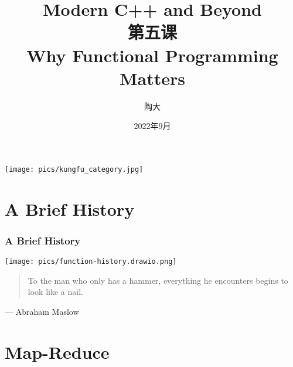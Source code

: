 \documentclass[UTF8,lualatex]{ctexbeamer}
\title{\kaishu Modern C++ and Beyond\\
    \small
    第五课\\
    Why Functional Programming Matters}
\author{陶大}
\date{2022年9月}
\begin{document}
\songti

\begin{frame}[plain]
    \titlepage
\end{frame}

\begin{frame}[plain]
    \begin{center}
        \texttt{[image: pics/kungfu\_category.jpg]}
    \end{center}
\end{frame}

\begin{frame}[plain]
    \tableofcontents
\end{frame}

\section{A Brief History}

\begin{frame}
    \frametitle{A Brief History}
    \begin{center}
        \texttt{[image: pics/function-history.drawio.png]}
    \end{center}
\end{frame}


\begin{frame}
    \Large
    \begin{quotation}
        To the man who only has a hammer, everything he encounters begins to look like a nail.
    \end{quotation}
    \flushright\normalsize --- {Abraham Maslow}
\end{frame}


\section{Map-Reduce}
\end{document}

